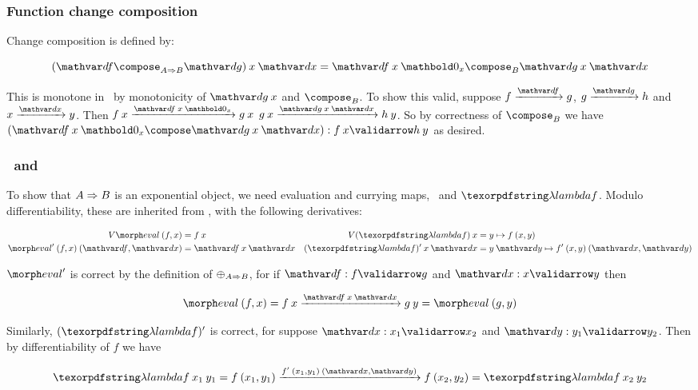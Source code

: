 \subsubsection{Function change composition}

Change composition is defined by:

\nopagebreak[2]
\[ (\df \compose_{\expO A B} \dg) \<x \<\dx = \df \<x \<\zero_x \compose_B \dg \<x \<\dx\]

\noindent
This is monotone in \dx\ by monotonicity of $\dg\<x$ and $\composefn_B$. To show
this valid, suppose $\vld\df f g$, $\vld\dg g h$ and $\vld\dx x y$. Then
%
\(\vld{\df\<x\<\zero_x}{f\<x}{g\<x}\)
\(\vld{\dg\<x\<\dx}{g\<x}{h\<y} \).
%
\noindent So by correctness of $\composefn_B$ we have \(\valid{(\df\<x\<\zero_x
  \compose \dg\<x\<\dx)}{f\<x}{h\<y}\) as desired.


\subsubsection{\texorpdfstring{\boldmath}{}\eval\ and \fn}

To show that $A \Rightarrow B$ is an exponential object, we need evaluation and
currying maps, \eval\ and $\fn f$. Modulo differentiability, these are
inherited from \Poset{}, with the following derivatives:

\begin{align*}
  \vals{\eval} \<(f,x) &= f\<x &
  \vals{(\fn f)} \<x &= y \mapsto f\<(x,y)\\
  \deriv{\eval} \<(f,x) \<(\df,\dx) &= \df \<x \<\dx &
  \deriv{(\fn f)} \<x \<\dx &= y\<\dy \mapsto \deriv f \<(x,y) \<(\dx,\dy)
\end{align*}

\noindent
$\deriv{\eval}$ is correct by the definition of ${\mathbin{\oplus}}_{A \Rightarrow B}$, for if
$\valid\df f g$ and $\valid\dx x y$ then

\nopagebreak[2]
\[ \eval\<(f,x) = {f\<x} \longvalidarrow{\df\<x\<\dx} {g\<y} = \eval\<(g,y) \]

\noindent
Similarly, \(\deriv{(\fn f)}\) is correct, for suppose $\valid\dx {x_1}{x_2}$
and $\valid\dy{y_1}{y_2}$. Then by differentiability of $f$ we have

\nopagebreak[2]
\[ \fn f \<x_1 \<y_1 =
f\<(x_1,y_1) \longvalidarrow{\deriv f \<(x_1,y_1) \<(\dx,\dy)} f\<(x_2,y_2)
= \fn f \<x_2 \<y_2
\]


